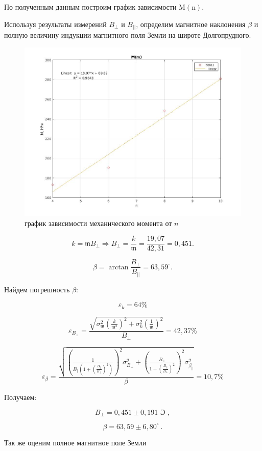 \documentclass[a4paper, 12pt]{article}%
\begin{document}
По полученным данным построим график зависимости $\mathrm{M}(\mathrm{n})$.

Используя результаты измерений $B_{\perp}$ и $B_{||}$, определим магнитное наклонения $\beta$ и полную величину индукции магнитного поля Земли на широте Долгопрудного.

\begin{figure}[h]
    \centering
    \includegraphics[width = 11 cm]{m(n)_big.jpg}
    \caption{график зависимости механического момента от $n$}
    \label{msh1}
\end{figure}

\[ k = \mathfrak{m} B_{\perp} \Rightarrow B_{\perp} = \frac{k}{\mathfrak{m}} = \frac{19,07}{42,31} = 0,451  .\]

\[ \beta = \arctan{\frac{B_{\perp}}{B_{||}}} = 63,59^{\circ} .\]

Найдем погрешность $\beta$:

\[ \varepsilon_{k} = 64\%\]

\[ \varepsilon_{B_{\perp}} = \frac{\sqrt{\sigma^2_{\mathfrak{m}} (\frac{k}{\mathfrak{m}^2})^2 + \sigma^2_k (\frac{1}{\mathfrak{m}})^2}}{B_{\perp}} = 42,37\% \]

\[ \varepsilon_{\beta} = \frac{\sqrt{ \left( \frac{1}{B_{\|}\left( 1+(\frac{B_{\|}}{B_{\perp}})^2\right)}\right)^2 \sigma^2_{B_{\perp}} + \left(\frac{B_{\perp}}{1 + (\frac{B_{\|}}{B_{\perp}})^2}\right)^2\sigma^2_{\beta_{\|}}}   }{\beta} =  10,7 \% \]

Получаем:

\[ B_{\perp} = 0,451 \pm 0,191 \text{ Э },\]

\[ \beta = 63,59 \pm 6,80 ^{\circ}\ .\]

Так же оценим полное магнитное поле Земли
\end{document}
